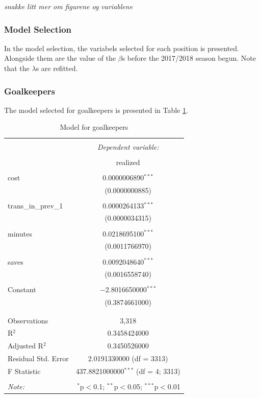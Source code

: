 \textit{snakke litt mer om figurene og variablene}

\subsubsection{Model Selection}
In the model selection, the variabels selected for each position is presented. Alongside them are the value of the $\beta$s before the 2017/2018 season begun. Note that the $\lambda$s are refitted. 

\subsubsection{Goalkeepers}
The model selected for goalkeepers is presented in Table \ref{tab:reg_gk}.

\begin{table}[!htbp] \centering 
  \caption{Model for goalkeepers} 
  \label{tab:reg_gk} 
\begin{tabular}{@{\extracolsep{5pt}}lc} 
\\[-1.8ex]\hline 
\hline \\[-1.8ex] 
 & \multicolumn{1}{c}{\textit{Dependent variable:}} \\ 
\cline{2-2} 
\\[-1.8ex] & realized \\ 
\hline \\[-1.8ex] 
 cost & 0.0000006890$^{***}$ \\ 
  & (0.0000000885) \\ 
  & \\ 
 trans\_in\_prev\_1 & 0.0000264133$^{***}$ \\ 
  & (0.0000034315) \\ 
  & \\ 
 minutes & 0.0218695100$^{***}$ \\ 
  & (0.0011766970) \\ 
  & \\ 
 saves & 0.0092048640$^{***}$ \\ 
  & (0.0016558740) \\ 
  & \\ 
 Constant & $-$2.8016650000$^{***}$ \\ 
  & (0.3874661000) \\ 
  & \\ 
\hline \\[-1.8ex] 
Observations & 3,318 \\ 
R$^{2}$ & 0.3458424000 \\ 
Adjusted R$^{2}$ & 0.3450526000 \\ 
Residual Std. Error & 2.0191330000 (df = 3313) \\ 
F Statistic & 437.8821000000$^{***}$ (df = 4; 3313) \\ 
\hline 
\hline \\[-1.8ex] 
\textit{Note:}  & \multicolumn{1}{r}{$^{*}$p$<$0.1; $^{**}$p$<$0.05; $^{***}$p$<$0.01} \\ 
\end{tabular} 
\end{table} 

